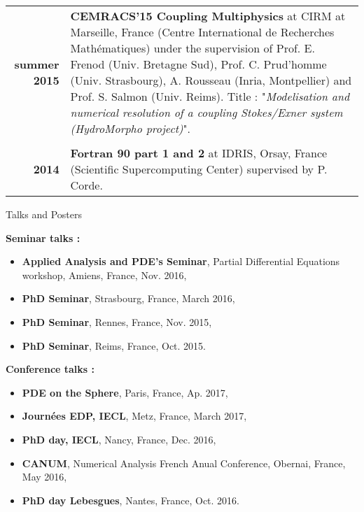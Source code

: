 \documentclass[10pt,a4paper]{report}
\begin{document}
\begin{center}
\begin{tabular}{r p{12cm}}
\textbf{summer 2015} & \textbf{CEMRACS'15 Coupling Multiphysics} at CIRM at Marseille, France (Centre International de Recherches Mathématiques) under the supervision of Prof. E. Frenod (Univ. Bretagne Sud), Prof. C. Prud'homme (Univ. Strasbourg), A. Rousseau (Inria, Montpellier) and Prof. S. Salmon (Univ. Reims).\newline
Title : "\textit{Modelisation and numerical resolution of a coupling Stokes/Exner system (HydroMorpho project)}".\\

& \\

\textbf{2014} & \textbf{Fortran 90 part 1 and 2} at IDRIS, Orsay, France (Scientific Supercomputing Center) supervised by P. Corde.\\

\end{tabular}
\end{center}


\vspace{.5cm}
\newpage
\noindent
{\selectfont
\begin{Large}
Talks and Posters
\end{Large}
\hrulefill
}
\vspace{0.5cm}
\noindent

\noindent
{\selectfont
\textbf{Seminar talks :}
}

\begin{itemize}
\item \textbf{Applied Analysis and PDE's Seminar}, Partial Differential Equations workshop, Amiens, France, Nov. 2016,
\item \textbf{PhD Seminar}, Strasbourg, France, March 2016,
\item \textbf{PhD Seminar}, Rennes, France, Nov. 2015,
\item \textbf{PhD Seminar}, Reims, France, Oct. 2015.
\end{itemize}

\vspace{0.3cm}
\noindent
{\selectfont
\textbf{Conference talks :}
}

\begin{itemize}
\item \textbf{PDE on the Sphere}, Paris, France, Ap. 2017,
\item \textbf{Journées EDP, IECL}, Metz, France, March 2017,
\item \textbf{PhD day, IECL}, Nancy, France, Dec. 2016,
\item \textbf{CANUM}, Numerical Analysis French Anual Conference, Obernai, France, May 2016,
\item \textbf{PhD day Lebesgues}, Nantes, France, Oct. 2016.
\end{itemize}
\end{document}
